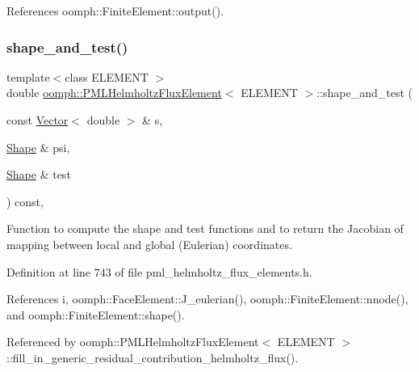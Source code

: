 References oomph\+::\+Finite\+Element\+::output().

\mbox{\label{classoomph_1_1PMLHelmholtzFluxElement_a36a98a04cd015bc86ba3c7a7680b1dd3}} 
\subsubsection{\texorpdfstring{shape\+\_\+and\+\_\+test()}{shape\_and\_test()}}
{\footnotesize\ttfamily template$<$class E\+L\+E\+M\+E\+NT $>$ \\
double \hyperlink{classoomph_1_1PMLHelmholtzFluxElement}{oomph\+::\+P\+M\+L\+Helmholtz\+Flux\+Element}$<$ E\+L\+E\+M\+E\+NT $>$\+::shape\+\_\+and\+\_\+test (\begin{DoxyParamCaption}\item[{const \hyperlink{classoomph_1_1Vector}{Vector}$<$ double $>$ \&}]{s,  }\item[{\hyperlink{classoomph_1_1Shape}{Shape} \&}]{psi,  }\item[{\hyperlink{classoomph_1_1Shape}{Shape} \&}]{test }\end{DoxyParamCaption}) const\hspace{0.3cm}{\ttfamily [inline]}, {\ttfamily [protected]}}



Function to compute the shape and test functions and to return the Jacobian of mapping between local and global (Eulerian) coordinates. 



Definition at line 743 of file pml\+\_\+helmholtz\+\_\+flux\+\_\+elements.\+h.



References i, oomph\+::\+Face\+Element\+::\+J\+\_\+eulerian(), oomph\+::\+Finite\+Element\+::nnode(), and oomph\+::\+Finite\+Element\+::shape().



Referenced by oomph\+::\+P\+M\+L\+Helmholtz\+Flux\+Element$<$ E\+L\+E\+M\+E\+N\+T $>$\+::fill\+\_\+in\+\_\+generic\+\_\+residual\+\_\+contribution\+\_\+helmholtz\+\_\+flux().

\mbox{\label{classoomph_1_1PMLHelmholtzFluxElement_acf1a94a1f41fcf43f5904ae1eab9306c}} 
